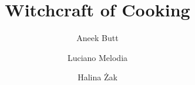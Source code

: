 \documentclass[ebook,12pt,oneside,openany]{memoir}
\title{Witchcraft of Cooking}
\author{Aneek Butt \and Luciano Melodia \and Halina Żak}
\begin{document}
\maketitle


\newpage
\tableofcontents*

\newpage

\newpage

\newpage

\newpage

\newpage

\end{document}
